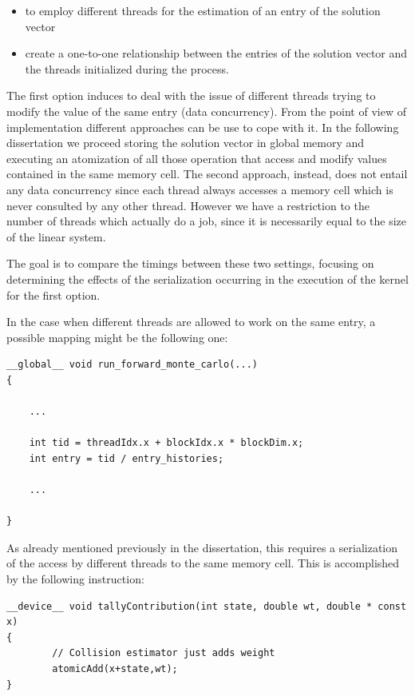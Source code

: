 \documentclass[a4paper,10pt]{article}
\begin{document}
\begin{itemize}
 \item to employ different threads for the estimation of an entry of the 
solution vector
\item create a one-to-one relationship between the entries of the 
solution vector and the threads initialized during the process.
\end{itemize}

The first option induces to deal with the issue of different threads trying to 
modify the value of the same entry (data concurrency). From the 
point of view of implementation different approaches can be use to cope with 
it. In the following dissertation we proceed storing the solution 
vector in 
global memory and executing an atomization of all those operation that
access and modify values contained in the same memory cell.
The second approach, instead, does not entail any data concurrency since each 
thread always accesses a memory cell which is never consulted by any other 
thread. However we have a restriction to the number of threads which 
actually do a job, since it is necessarily  
equal to the size of the linear system.


The goal is to compare the timings between these two settings, focusing on 
determining the effects of the serialization occurring in the execution 
of the kernel for the first option.\newline

In the case when different threads are allowed to work on the same entry, a 
possible mapping might be the following one:

\hspace*{-2cm}
\begin{lstlisting}
__global__ void run_forward_monte_carlo(...)
{

    ...
   
    int tid = threadIdx.x + blockIdx.x * blockDim.x;
    int entry = tid / entry_histories;
    
    ...

}   
\end{lstlisting}

As already mentioned previously in the dissertation, this requires a 
serialization of the access by different threads to the same memory cell. This 
is accomplished by the following instruction:

\hspace*{-2cm}
\begin{lstlisting}
__device__ void tallyContribution(int state, double wt, double * const x)
{
        // Collision estimator just adds weight
        atomicAdd(x+state,wt);
}
\end{lstlisting}
\end{document}
